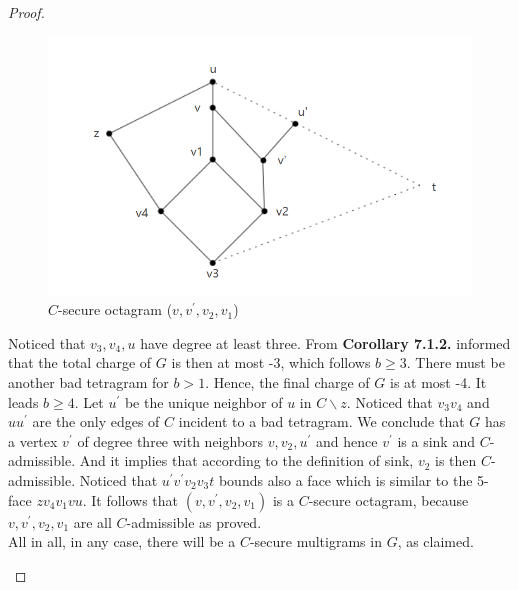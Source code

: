\begin{proof}
\begin{itemize}
\begin{itemize}
        \begin{figure}[H] %
            \centering %
            \includegraphics[width=0.7 \textwidth]{figure/temp.png} 
            \caption{$C$-secure octagram ($v, v^{'}, v_2, v_1$)} %
            \label{figure} %
        \end{figure}
        Noticed that $v_3, v_4, u$ have degree at least three. From \textbf{Corollary 7.1.2.} informed that the total charge of $G$ is then at most -3, which follows $b \geq 3$. There must be another bad tetragram for $b > 1$. Hence, the final charge of $G$ is at most -4. It leads $b \geq 4$. Let $u^{'}$ be the unique neighbor of $u$ in $C \backslash z$. Noticed that $v_3v_4$ and $uu^{'}$ are the only edges of $C$ 
       incident to a bad tetragram. We conclude that $G$ has a vertex $v^{'}$ of degree three with neighbors $v, v_2, u^{'}$ and hence $v^{'}$ is a sink and $C$-admissible. And it implies that according to the definition of sink, $v_2$ is then $C$-admissible. Noticed that $u^{'}v^{'}v_2v_3t$ bounds also a face which is similar to the 5-face $zv_4v_1vu$. It follows that $(v, v^{'}, v_2, v_1)$ is a $C$-secure octagram, because $v, v^{'}, v_2, v_1$ are all $C$-admissible as proved.\\
        All in all, in any case, there will be a $C$-secure multigrams in $G$, as claimed.

    \end{itemize}
\end{itemize}
\end{proof}

